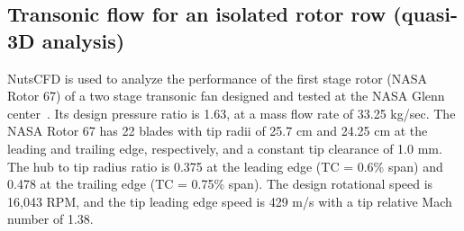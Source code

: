 \documentclass[journal,final]{new-aiaa}
\begin{document}
%
%
%
%



\subsection{Transonic flow for an isolated rotor row (quasi-3D analysis)}
NutsCFD is used to analyze the performance of the first
stage rotor (NASA Rotor 67) of a two stage transonic fan
designed and tested at the NASA Glenn center~\cite{strazisar1989laser}.
Its design pressure ratio is
1.63, at a mass flow rate of 33.25 kg/sec. 
The NASA Rotor 67 has 22 blades with tip radii of 25.7 cm
and 24.25 cm at the leading and trailing edge, respectively,
and a constant tip clearance of 1.0 mm. The hub to tip radius
ratio is 0.375 at the leading edge (TC = 0.6\% span) and 0.478
at the trailing edge (TC = 0.75\% span). The design rotational
speed is 16,043 RPM, and the tip leading edge speed is 429 m/s
with a tip relative Mach number of 1.38.
\end{document}
